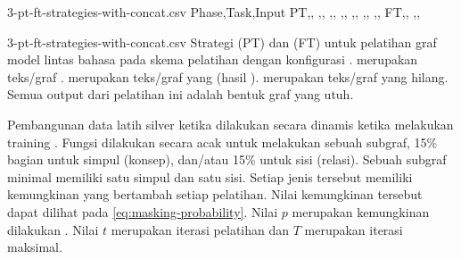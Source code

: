 \begin{filecontents*}{3-pt-ft-strategies-with-concat.csv}
Phase,Task,Input
PT,,\makecell[cl]{\idTagged{[mask]}\enTagged{[mask]}\graphMasked{}}
,,
,,
,,
,,
,,
,,
FT,,
,,
\end{filecontents*}
  {3-pt-ft-strategies-with-concat.csv}
  {
    Strategi \pretraining{} (PT) dan \finetuning{} (FT) untuk pelatihan graf model \amrparsing{} lintas bahasa pada skema pelatihan  dengan konfigurasi .
     merupakan teks/graf .
     merupakan teks/graf yang  (hasil \denoising{}).
     merupakan teks/graf yang hilang.
    Semua output dari pelatihan ini adalah bentuk graf yang utuh.
  }

Pembangunan data latih silver ketika \pretraining{} dilakukan  secara dinamis ketika melakukan training .
Fungsi  dilakukan secara acak untuk melakukan  sebuah subgraf, 15\% bagian untuk  simpul (konsep), dan/atau 15\% untuk  sisi (relasi).
Sebuah subgraf minimal memiliki satu simpul dan satu sisi.
Setiap jenis  tersebut memiliki kemungkinan yang bertambah setiap  pelatihan.
Nilai kemungkinan tersebut dapat dilihat pada \cref{eq:masking-probability}.
Nilai $p$ merupakan kemungkinan dilakukan .
Nilai $t$ merupakan iterasi pelatihan dan $T$ merupakan iterasi maksimal.

